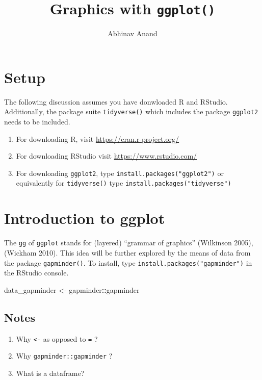 \documentclass[12pt,]{article}
\title{Graphics with \texttt{ggplot()}}
\author{Abhinav Anand}
\date{}
\newenvironment{Shaded}{\begin{snugshade}}{\end{snugshade}}
\newcommand{\StringTok}[1]{\textcolor[rgb]{0.31,0.60,0.02}{#1}}
\newcommand{\OperatorTok}[1]{\textcolor[rgb]{0.81,0.36,0.00}{\textbf{#1}}}
\newcommand{\NormalTok}[1]{#1}
\providecommand{\tightlist}{%
  \setlength{\itemsep}{0pt}\setlength{\parskip}{0pt}}
\begin{document}
\maketitle

\section{Setup}\label{setup}

The following discussion assumes you have donwloaded R and RStudio.
Additionally, the package suite \texttt{tidyverse()} which includes the
package \texttt{ggplot2} needs to be included.

\begin{enumerate}
\def\labelenumi{\arabic{enumi}.}
\tightlist
\item
  For downloading R, visit \url{https://cran.r-project.org/}
\item
  For downloading RStudio visit \url{https://www.rstudio.com/}
\item
  For downloading \texttt{ggplot2}, type
  \texttt{install.packages("ggplot2")} or equivalently for
  \texttt{tidyverse()} type \texttt{install.packages("tidyverse")}
\end{enumerate}

\section{Introduction to ggplot}\label{introduction-to-ggplot}

The \texttt{gg} of \texttt{ggplot} stands for (layered) ``grammar of
graphics'' (Wilkinson 2005), (Wickham 2010). This idea will be further
explored by the means of data from the package \texttt{gapminder()}. To
install, type \texttt{install.packages("gapminder")} in the RStudio
console.

\begin{Shaded}
\begin{Highlighting}[]
\NormalTok{data_gapminder <-}\StringTok{ }\NormalTok{gapminder}\OperatorTok{::}\NormalTok{gapminder }
\end{Highlighting}
\end{Shaded}

\subsection{Notes}\label{notes}

\begin{enumerate}
\def\labelenumi{\arabic{enumi}.}
\item
  Why \texttt{\textless{}-} as opposed to \texttt{=} ?
\item
  Why \texttt{gapminder::gapminder} ?
\item
  What is a dataframe?
\end{enumerate}
\end{document}
